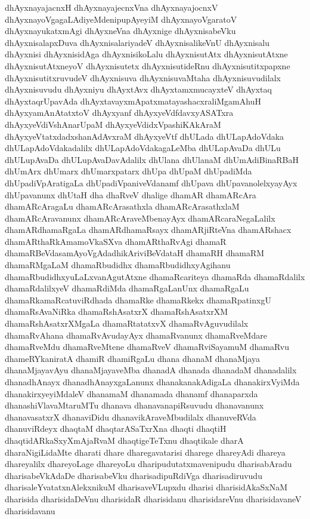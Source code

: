 {dhAyxnayajacnxH
dhAyxnayajecnxVna
dhAyxnayajocnxV
dhAyxnayoVgagaLAdiyeMdenipupAyeyiM
dhAyxnayoVgaratoV
dhAyxnayukatxmAgi
dhAyxneVna
dhAyxnige
dhAyxnisabeVku
dhAyxnisalapxDuva
dhAyxnisalariyadeV
dhAyxnisalikeVnU
dhAyxnisalu
dhAyxnisi
dhAyxnisidAga
dhAyxnisikoLalu
dhAyxnisutAtx
dhAyxnisutAtxne
dhAyxnisutAtxneyoV
dhAyxnisutetx
dhAyxnisutideRnu
dhAyxnisutitxpapxne
dhAyxnisutitxruvudeV
dhAyxnisuva
dhAyxnisuvaMtaha
dhAyxnisuvudilalx
dhAyxnisuvudu
dhAyxniyu
dhAyxtAvx
dhAyxtamxmucayxteV
dhAyxtaq
dhAyxtaqrUpavAda
dhAyxtavayxmApatxmatayashacxraliMgamAhuH
dhAyxyamAnAtatxtoV
dhAyxyanf
dhAyxyeVdfdavxyASATxra
dhAyxyeVdiVshAnarUpaM
dhAyxyeVdidxVpashiKAkAraM
dhAyxyeVtatxdadxshanAdAvxraM
dhAyxyeVtf
dhULada
dhULapAdoVdaka
dhULapAdoVdakadalilx
dhULapAdoVdakagaLeMba
dhULapAvaDa
dhULu
dhULupAvaDa
dhULupAvaDavAdalilx
dhUlana
dhUlanaM
dhUmAdiBinaRBaH
dhUmArx
dhUmarx
dhUmarxpatarx
dhUpa
dhUpaM
dhUpadiMda
dhUpadiVpAratigaLa
dhUpadiVpaniveVdanamf
dhUpava
dhUpavanolelxyayAyx
dhUpavanunx
dhUtaH
dha
dhaRveV
dhalige
dhamAR
dhamARcAra
dhamARcAragaLu
dhamARcArasathxla
dhamARcArasathxlaM
dhamARcAravanunx
dhamARcAraveMbenayAyx
dhamARcaraNegaLalilx
dhamARdhamaRgaLa
dhamARdhamaRsayx
dhamARjiRteVna
dhamARshacx
dhamARthaRkAmamoVkaSXva
dhamARthaRvAgi
dhamaR
dhamaRBeVdasamAyoVgAdadhikAriviBeVdataH
dhamaRH
dhamaRM
dhamaRMgaLaM
dhamaRbudidhx
dhamaRbudidhxyAgihanu
dhamaRbudidhxyuLaLxvanAgutAtxne
dhamaRcariteya
dhamaRda
dhamaRdalilx
dhamaRdalilxyeV
dhamaRdiMda
dhamaRgaLanUnx
dhamaRgaLu
dhamaRkamaRcatuviRdhada
dhamaRke
dhamaRkekx
dhamaRpatinxgU
dhamaRsAvaNiRka
dhamaRshAsatxrX
dhamaRshAsatxrXM
dhamaRshAsatxrXMgaLa
dhamaRtatatxvX
dhamaRvAguvudilalx
dhamaRvAhana
dhamaRvAvudayAyx
dhamaRvanunx
dhamaRveMdare
dhamaRveMdu
dhamaRveMtene
dhamaRveV
dhamaRviSayamuM
dhamaRvu
dhameRYkaniratA
dhamiR
dhamiRgaLu
dhana
dhanaM
dhanaMjaya
dhanaMjayavAyu
dhanaMjayaveMba
dhanadA
dhanada
dhanadaM
dhanadalilx
dhanadhAnayx
dhanadhAnayxgaLanunx
dhanakanakAdigaLa
dhanakirxVyiMda
dhanakirxyeyiMdaleV
dhanamaM
dhanamada
dhanamf
dhanaparxda
dhanashiVlavaMtaruMTu
dhanava
dhanavanapiRsuvudu
dhanavanunx
dhanavasatxrX
dhanaviDidu
dhanavikAraveMbudilalx
dhanuveRVda
dhanuviRdeyx
dhaqtaM
dhaqtarASaTxrXna
dhaqti
dhaqtiH
dhaqtidARkaSxyXmAjaRvaM
dhaqtigeTeTxnu
dhaqtikale
dharA
dharaNigiLidaMte
dharati
dhare
dharegavatarisi
dharege
dhareyAdi
dhareya
dhareyalilx
dhareyoLage
dhareyoLu
dharipudutatxmavenipudu
dharisabAradu
dharisabeVkAdaDe
dharisabeVku
dharisadipuRdiVga
dharisadiruvudu
dharisaleYvatatxnAlekxnikuM
dharisaveVLupxdu
dharisi
dharisidAkaSxNaM
dharisida
dharisidaDeVnu
dharisidaR
dharisidanu
dharisidareVnu
dharisidavaneV
dharisidavanu
}
